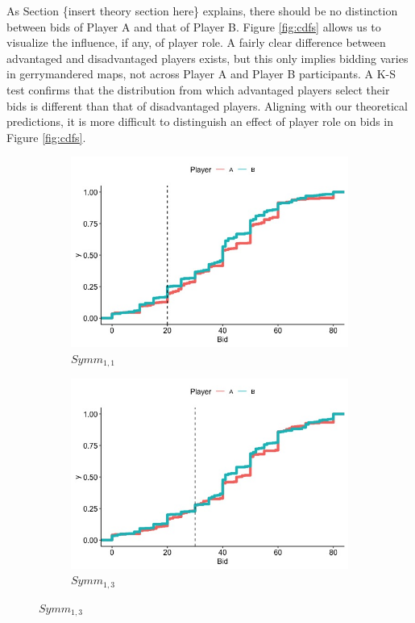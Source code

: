 \documentclass[AER]{AEA}
\begin{document}
As Section \{insert theory section here\} explains, there should be no distinction between bids of Player A and that of Player B. Figure \ref{fig:cdfs} allows us to visualize the influence, if any, of player role. A fairly clear difference between advantaged and disadvantaged players exists, but this only implies bidding varies in gerrymandered maps, not across Player A and Player B participants. A K-S test confirms that the distribution from which advantaged players select their bids is different than that of disadvantaged players. Aligning with our theoretical predictions, it is more difficult to distinguish an effect of player role on bids in Figure \ref{fig:cdfs}. 
\begin{figure}
    \centering
    \begin{subfigure}[t]{0.45\textwidth}
        \centering
        \includegraphics[scale = .35]{symm_1_1_cdf.jpeg} 
        \caption{$Symm_{1,1}$} \label{fig:symm_1_1_cdf}
    \end{subfigure}
    \hfill
    \begin{subfigure}[t]{0.45\textwidth}
        \centering
        \includegraphics[scale = .35]{symm_1_3_cdf.jpeg}
        \caption{$Symm_{1,3}$} \label{fig:symm_1_3_cdf}
    \end{subfigure}


\end{figure}
\end{document}
